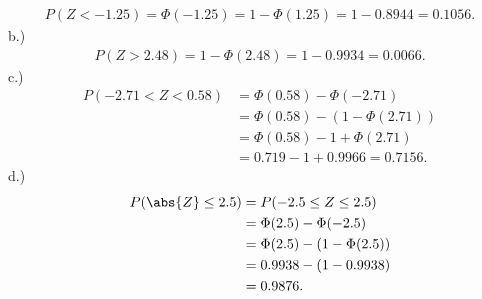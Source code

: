 \documentclass{report}
\begin{document}
 \begin{align*}
     P(Z < -1.25) = \Phi(-1.25) = 1-\Phi(1.25) = 1-0.8944 = 0.1056
 .\end{align*}
 \bigbreak \noindent 
 b.) 
 \begin{align*}
     P(Z > 2.48) = 1-\Phi(2.48) = 1-0.9934 = 0.0066
 .\end{align*}
 \bigbreak \noindent 
 c.) 
 \begin{align*}
     P(-2.71 < Z < 0.58) &= \Phi(0.58) - \Phi(-2.71) \\
                         &=\Phi(0.58) - (1-\Phi(2.71))  \\
                         &= \Phi(0.58) - 1 + \Phi(2.71) \\
                         &=0.719 - 1 + 0.9966 = 0.7156
 .\end{align*}
 \bigbreak \noindent 
 d.)
 \begin{align*}
     P(\abs{Z} \leq 2.5) &= P(-2.5 \leq Z \leq 2.5) \\
     &=\Phi(2.5) - \Phi(-2.5) \\
     &= \Phi(2.5) - (1-\Phi(2.5)) \\
     &=0.9938 - (1-0.9938) \\
     &=0.9876
 .\end{align*}
\end{document}
